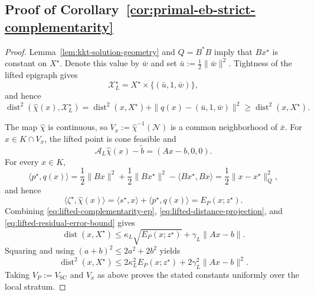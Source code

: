 \documentclass[letterpaper]{article} %
\theoremstyle{definition}
\theoremstyle{remark}
\begin{document}
\subsection{Proof of Corollary~\ref{cor:primal-eb-strict-complementarity}}
\label{app:proof-primal-eb-strict-complementarity}

\begin{proof}
Lemma~\ref{lem:kkt-solution-geometry} and $Q=B^*B$ imply that $Bx^\star$
is constant on $X^\star$.  Denote this value by $\bar w$ and set
$\bar u:=\frac12\|\bar w\|^2$.  Tightness of the lifted epigraph gives
\begin{equation}
\label{eq:lifted-solution-set}
    \mathcal X_L^\star
    =
    X^\star\times\{(\bar u,1,\bar w)\},
\end{equation}
and hence
\begin{equation}
\label{eq:lifted-distance-projection}
    \operatorname{dist}^2(\widehat\chi(x),\mathcal X_L^\star)
    =
    \operatorname{dist}^2(x,X^\star)
    +\|q(x)-(\bar u,1,\bar w)\|^2
    \ge
    \operatorname{dist}^2(x,X^\star).
\end{equation}

The map $\widehat\chi$ is continuous, so
$V_x:=\widehat\chi^{-1}(\mathcal N)$ is a common neighborhood of $\bar x$.
For $x\in K\cap V_x$, the lifted point is cone feasible and
\[
    \mathcal A_L\widehat\chi(x)-\widetilde b=(Ax-b,0,0).
\]
For every $x\in K$,
\begin{equation}
\label{eq:objective-complementarity}
    \langle p^\star,q(x)\rangle = \frac12\|Bx\|^2+\frac12\|Bx^\star\|^2 -\langle Bx^\star,Bx\rangle = \frac12\|x-x^\star\|_Q^2,
\end{equation}
and hence
\begin{equation}
\label{eq:lifted-complementarity-ep}
    \langle\zeta^\star,\widehat\chi(x)\rangle
    =
    \langle s^\star,x\rangle+\langle p^\star,q(x)\rangle
    =
    E_P(x;z^\star).
\end{equation}
Combining \eqref{eq:lifted-complementarity-ep},
\eqref{eq:lifted-distance-projection}, and
\eqref{eq:lifted-residual-error-bound} gives
\[
    \operatorname{dist}(x,X^\star)
    \le
    \kappa_L\sqrt{E_P(x;z^\star)}
    +\gamma_L\|Ax-b\|.
\]
Squaring and using $(a+b)^2\le2a^2+2b^2$ yields
\[
    \operatorname{dist}^2(x,X^\star)
    \le
    2\kappa_L^2E_P(x;z^\star)
    +2\gamma_L^2\|Ax-b\|^2.
\]
Taking $V_P:=V_{\mathrm{SC}}$ and $V_x$ as above proves the stated
constants uniformly over the local stratum.
\end{proof}
\end{document}
